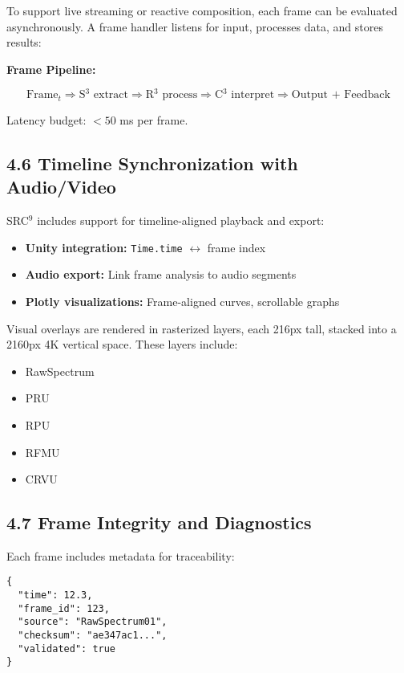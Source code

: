 To support live streaming or reactive composition, each frame can be evaluated asynchronously. A frame handler listens for input, processes data, and stores results:

\textbf{Frame Pipeline:}

\[
\text{Frame}_t \Rightarrow \text{S$^3$ extract} \Rightarrow \text{R$^3$ process} \Rightarrow \text{C$^3$ interpret} \Rightarrow \text{Output + Feedback}
\]

Latency budget: $< 50$ ms per frame.

\subsection*{4.6 Timeline Synchronization with Audio/Video}

SRC$^9$ includes support for timeline-aligned playback and export:

\begin{itemize}
    \item \textbf{Unity integration:} \texttt{Time.time} $\leftrightarrow$ frame index
    \item \textbf{Audio export:} Link frame analysis to audio segments
    \item \textbf{Plotly visualizations:} Frame-aligned curves, scrollable graphs
\end{itemize}

Visual overlays are rendered in rasterized layers, each 216px tall, stacked into a 2160px 4K vertical space. These layers include:

\begin{itemize}
    \item RawSpectrum
    \item PRU
    \item RPU
    \item RFMU
    \item CRVU
\end{itemize}

\subsection*{4.7 Frame Integrity and Diagnostics}

Each frame includes metadata for traceability:

\begin{verbatim}
{
  "time": 12.3,
  "frame_id": 123,
  "source": "RawSpectrum01",
  "checksum": "ae347ac1...",
  "validated": true
}
\end{verbatim}

